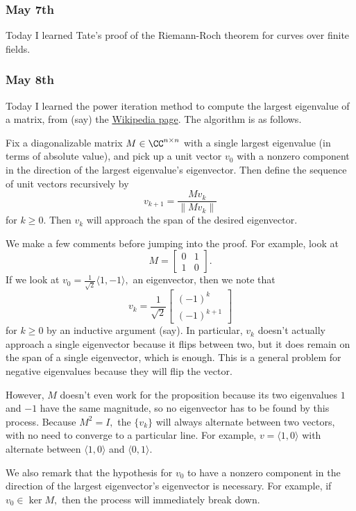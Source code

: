\subsubsection{May 7th}
Today I learned Tate's proof of the Riemann-Roch theorem for curves over finite fields.\todo{}

\subsubsection{May 8th}
Today I learned the power iteration method to compute the largest eigenvalue of a matrix, from (say) the \href{https://web.archive.org/web/20210506174826/https://en.wikipedia.org/wiki/Power_iteration}{Wikipedia page}. The algorithm is as follows.
\begin{proposition}
    Fix a diagonalizable matrix $M\in\CC^{n\times n}$ with a single largest eigenvalue (in terms of absolute value), and pick up a unit vector $v_0$ with a nonzero component in the direction of the largest eigenvalue's eigenvector. Then define the sequence of unit vectors recursively by
    \[v_{k+1}=\frac{Mv_k}{\lVert Mv_k\rVert}\]
    for $k\ge0.$ Then $v_k$ will approach the span of the desired eigenvector.
\end{proposition}
We make a few comments before jumping into the proof. For example, look at
\[M=\begin{bmatrix} 0 & 1 \\ 1 & 0 \end{bmatrix}.\]
If we look at $v_0=\frac1{\sqrt2}\langle1,-1\rangle,$ an eigenvector, then we note that
\[v_k=\frac1{\sqrt2}\begin{bmatrix}(-1)^k \\ (-1)^{k+1} \end{bmatrix}\]
for $k\ge0$ by an inductive argument (say). In particular, $v_k$ doesn't actually approach a single eigenvector because it flips between two, but it does remain on the span of a single eigenvector, which is enough. This is a general problem for negative eigenvalues because they will flip the vector.

However, $M$ doesn't even work for the proposition because its two eigenvalues $1$ and $-1$ have the same magnitude, so no eigenvector has to be found by this process. Because $M^2=I,$ the $\{v_k\}$ will always alternate between two vectors, with no need to converge to a particular line. For example, $v=\langle1,0\rangle$ with alternate between $\langle1,0\rangle$ and $\langle0,1\rangle.$

We also remark that the hypothesis for $v_0$ to have a nonzero component in the direction of the largest eigenvector's eigenvector is necessary. For example, if $v_0\in\ker M,$ then the process will immediately break down.


